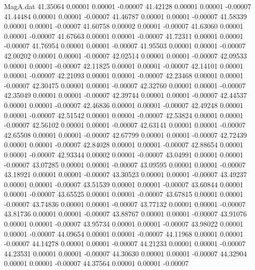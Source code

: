 \begin{filecontents}{MagA.dat}
  41.35064    0.00001    0.00001   -0.00007
  41.42128    0.00001    0.00001   -0.00007
  41.44484    0.00001    0.00001   -0.00007
  41.46787    0.00001    0.00001   -0.00007
  41.58339    0.00001    0.00001   -0.00007
  41.60758    0.00002    0.00001   -0.00007
  41.63060    0.00001    0.00001   -0.00007
  41.67663    0.00001    0.00001   -0.00007
  41.72311    0.00001    0.00001   -0.00007
  41.76954    0.00001    0.00001   -0.00007
  41.95503    0.00001    0.00001   -0.00007
  42.00202    0.00001    0.00001   -0.00007
  42.02514    0.00001    0.00001   -0.00007
  42.09533    0.00001    0.00001   -0.00007
  42.11825    0.00001    0.00001   -0.00007
  42.14101    0.00001    0.00001   -0.00007
  42.21093    0.00001    0.00001   -0.00007
  42.23468    0.00001    0.00001   -0.00007
  42.30475    0.00001    0.00001   -0.00007
  42.32760    0.00001    0.00001   -0.00007
  42.35049    0.00001    0.00001   -0.00007
  42.39744    0.00001    0.00001   -0.00007
  42.44537    0.00001    0.00001   -0.00007
  42.46836    0.00001    0.00001   -0.00007
  42.49248    0.00001    0.00001   -0.00007
  42.51542    0.00001    0.00001   -0.00007
  42.53824    0.00001    0.00001   -0.00007
  42.56102    0.00001    0.00001   -0.00007
  42.63141    0.00001    0.00001   -0.00007
  42.65508    0.00001    0.00001   -0.00007
  42.67799    0.00001    0.00001   -0.00007
  42.72439    0.00001    0.00001   -0.00007
  42.84028    0.00001    0.00001   -0.00007
  42.88654    0.00001    0.00001   -0.00007
  42.93344    0.00002    0.00001   -0.00007
  43.04991    0.00001    0.00001   -0.00007
  43.07285    0.00001    0.00001   -0.00007
  43.09595    0.00001    0.00001   -0.00007
  43.18921    0.00001    0.00001   -0.00007
  43.30523    0.00001    0.00001   -0.00007
  43.49237    0.00001    0.00001   -0.00007
  43.51539    0.00001    0.00001   -0.00007
  43.60844    0.00001    0.00001   -0.00007
  43.65525    0.00001    0.00001   -0.00007
  43.67815    0.00001    0.00001   -0.00007
  43.74836    0.00001    0.00001   -0.00007
  43.77132    0.00001    0.00001   -0.00007
  43.81736    0.00001    0.00001   -0.00007
  43.88767    0.00001    0.00001   -0.00007
  43.91076    0.00001    0.00001   -0.00007
  43.95734    0.00001    0.00001   -0.00007
  43.98022    0.00001    0.00001   -0.00007
  44.09654    0.00001    0.00001   -0.00007
  44.11968    0.00001    0.00001   -0.00007
  44.14278    0.00001    0.00001   -0.00007
  44.21233    0.00001    0.00001   -0.00007
  44.23531    0.00001    0.00001   -0.00007
  44.30630    0.00001    0.00001   -0.00007
  44.32904    0.00001    0.00001   -0.00007
  44.37564    0.00001    0.00001   -0.00007

\end{filecontents}
